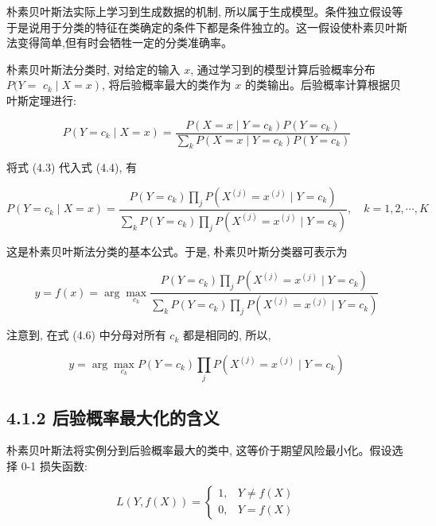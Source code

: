 \documentclass[10pt]{article}
\begin{document}
朴素贝叶斯法实际上学习到生成数据的机制, 所以属于生成模型。条件独立假设等于是说用于分类的特征在类确定的条件下都是条件独立的。这一假设使朴素贝叶斯法变得简单,但有时会牺牲一定的分类准确率。

朴素贝叶斯法分类时, 对给定的输入 $x$, 通过学习到的模型计算后验概率分布 $P(Y=$ $\left.c_{k} \mid X=x\right)$, 将后验概率最大的类作为 $x$ 的类输出。后验概率计算根据贝叶斯定理进行:


\begin{equation*}
P\left(Y=c_{k} \mid X=x\right)=\frac{P\left(X=x \mid Y=c_{k}\right) P\left(Y=c_{k}\right)}{\sum_{k} P\left(X=x \mid Y=c_{k}\right) P\left(Y=c_{k}\right)} \tag{4.4}
\end{equation*}


将式 (4.3) 代入式 (4.4), 有


\begin{equation*}
P\left(Y=c_{k} \mid X=x\right)=\frac{P\left(Y=c_{k}\right) \prod_{j} P\left(X^{(j)}=x^{(j)} \mid Y=c_{k}\right)}{\sum_{k} P\left(Y=c_{k}\right) \prod_{j} P\left(X^{(j)}=x^{(j)} \mid Y=c_{k}\right)}, \quad k=1,2, \cdots, K \tag{4.5}
\end{equation*}


这是朴素贝叶斯法分类的基本公式。于是, 朴素贝叶斯分类器可表示为


\begin{equation*}
y=f(x)=\arg \max _{c_{k}} \frac{P\left(Y=c_{k}\right) \prod_{j} P\left(X^{(j)}=x^{(j)} \mid Y=c_{k}\right)}{\sum_{k} P\left(Y=c_{k}\right) \prod_{j} P\left(X^{(j)}=x^{(j)} \mid Y=c_{k}\right)} \tag{4.6}
\end{equation*}


注意到, 在式 (4.6) 中分母对所有 $c_{k}$ 都是相同的, 所以,


\begin{equation*}
y=\arg \max _{c_{k}} P\left(Y=c_{k}\right) \prod_{j} P\left(X^{(j)}=x^{(j)} \mid Y=c_{k}\right) \tag{4.7}
\end{equation*}


\subsection*{4.1.2 后验概率最大化的含义}
朴素贝叶斯法将实例分到后验概率最大的类中, 这等价于期望风险最小化。假设选择 0-1 损失函数:

$$
L(Y, f(X))=\left\{\begin{array}{cc}
1, & Y \neq f(X) \\
0, & Y=f(X)
\end{array}\right.
$$
\end{document}
